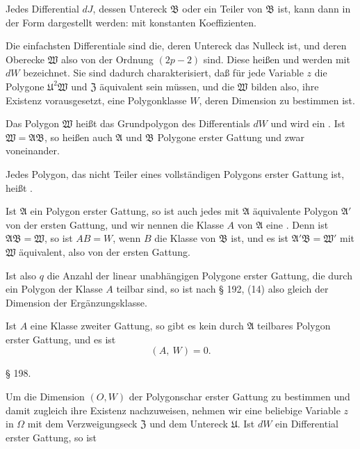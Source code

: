 
Jedes Differential $dJ$, dessen Untereck $\mathfrak{B}$ oder ein Teiler
von $\mathfrak{B}$ ist, kann dann in der Form dargestellt werden:
mit konstanten Koeffizienten.

Die einfachsten Differentiale sind die, deren Untereck das
Nulleck ist, und deren Oberecke $\mathfrak{W}$ also von der Ordnung
$(2p - 2)$ sind. Diese heißen 
und werden mit $dW$ bezeichnet. Sie sind dadurch charakterisiert,
daß für jede Variable $z$ die Polygone $\mathfrak{U}^2\mathfrak{W}$ und $\mathfrak{Z}$ äquivalent sein
müssen, und die $\mathfrak{W}$ bilden also, ihre Existenz vorausgesetzt, eine
Polygonklasse $W$, deren Dimension zu bestimmen ist.

Das Polygon $\mathfrak{W}$ heißt das Grundpolygon des Differentials $dW$
und wird ein . Ist
$\mathfrak{W} = \mathfrak{A}\mathfrak{B}$, so heißen auch $\mathfrak{A}$ und $\mathfrak{B}$ Polygone erster
Gattung und zwar  voneinander.

Jedes Polygon, das nicht Teiler eines vollständigen Polygons
erster Gattung ist, heißt .

Ist $\mathfrak{A}$ ein Polygon erster Gattung, so ist auch jedes mit $\mathfrak{A}$
äquivalente Polygon $\mathfrak{A}'$ von der ersten Gattung, und wir nennen
die Klasse $A$ von $\mathfrak{A}$ eine . Denn ist
$\mathfrak{A}\mathfrak{B} = \mathfrak{W}$, so ist $AB = W$, wenn $B$ die Klasse von $\mathfrak{B}$ ist, und
es ist $\mathfrak{A}'\mathfrak{B} = \mathfrak{W}'$ mit $\mathfrak{W}$ äquivalent, also von der ersten Gattung.

Ist also $q$ die Anzahl der linear unabhängigen Polygone
erster Gattung, die durch ein Polygon der Klasse $A$ teilbar sind,
so ist nach § 192, (14)
also gleich der Dimension der Ergänzungsklasse.

Ist $A$ eine Klasse zweiter Gattung, so gibt es kein durch
$\mathfrak{A}$ teilbares Polygon erster Gattung, und es ist
\[ (A,\ W) = 0. \]

\begin{center}
§ 198. \textbf{}
\end{center}

Um die Dimension $(O, W)$ der Polygonschar erster Gattung zu
bestimmen und damit zugleich ihre Existenz nachzuweisen, nehmen
wir eine beliebige Variable $z$ in $\Omega$ mit dem Verzweigungseck
$\mathfrak{Z}$ und dem Untereck $\mathfrak{U}$. Ist $dW$ ein Differential erster Gattung,
so ist
